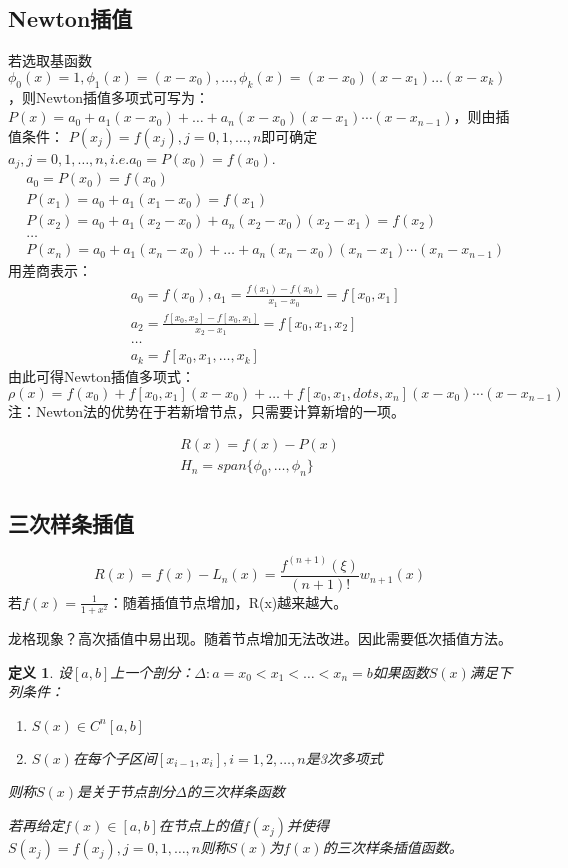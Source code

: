 \documentclass[a4paper]{article}
\newtheorem{definition}{定义}[section]
\begin{document}
\subsection{Newton插值}
若选取基函数$\phi_0(x)=1, \phi_1(x)=(x-x_0), \dots, \phi_k(x)=(x-x_0)(x-x_1)\dots(x-x_k) $，则Newton插值多项式可写为：$P(x)=a_0+a_1(x-x_0)+\dots+a_n(x-x_0)(x-x_1)\cdots(x-x_{n-1}) $，则由插值条件：
$P(x_j)=f(x_j),j=0,1,\dots, n $即可确定$a_j, j=0,1,\dots, n, i.e. a_0=P(x_0)=f(x_0) $.
\begin{align*}
    &a_0 = P(x_0) = f(x_0)\\
    &P(x_1)=a_0+a_1(x_1-x_0) = f(x_1) \\
    &P(x_2)=a_0+a_1(x_2-x_0)+a_n(x_2-x_0)(x_2-x_1) =f(x_2) \\
    &\dots \\
    &P(x_n)=a_0+a_1(x_n-x_0)+\dots+a_n(x_n-x_0)(x_n-x_1)\cdots(x_n-x_{n-1}) 
\end{align*}
用差商表示：
\begin{align*}
    &a_0=f(x_0), a_1 = \frac{f(x_1)-f(x_0)}{x_1-x_0}=f[x_0, x_1]  \\
    &a_2 = \frac{f[x_0, x_2]-f[x_0, x_1]}{x_2-x_1} = f[x_0, x_1, x_2] \\
    &\dots \\
    &a_k = f[x_0, x_1, \dots, x_k]
\end{align*}
由此可得Newton插值多项式：
\begin{equation}
    \rho(x) = f(x_0)+f[x_0,x_1](x-x_0) + \dots + f[x_0, x_1, dots, x_n](x-x_0)\cdots(x-x_{n-1})
\end{equation}
注：Newton法的优势在于若新增节点，只需要计算新增的一项。

\begin{align*}
    R(x) = f(x)-P(x) \\
    H_n = span\{\phi_0, \dots, \phi_n\}
\end{align*}

\subsection{三次样条插值}
$$
R(x) = f(x)-L_n(x) = \frac{f^{(n+1)}(\xi)}{(n+1)!}w_{n+1}(x)
$$
若$f(x)=\frac{1}{1+x^2}$：随着插值节点增加，R(x)越来越大。

龙格现象？高次插值中易出现。随着节点增加无法改进。因此需要低次插值方法。

\begin{definition}
    设$[a,b]$上一个剖分：$\Delta: a=x_0<x_1<\dots<x_n=b$如果函数$S(x)$满足下列条件：
    \begin{enumerate}
        \item $S(x) \in C^n[a,b] $
        \item $S(x)$在每个子区间$[x_{i-1}, x_i],i=1,2,\dots, n$是3次多项式
    \end{enumerate}
    则称$S(x)$是关于节点剖分$\Delta$的三次样条函数
    
    若再给定$f(x)\in [a,b] $在节点上的值$f(x_j) $并使得$S(x_j)=f(x_j),j=0,1,\dots,n $则称$S(x) $为$f(x)$的三次样条插值函数。
\end{definition}
\end{document}
